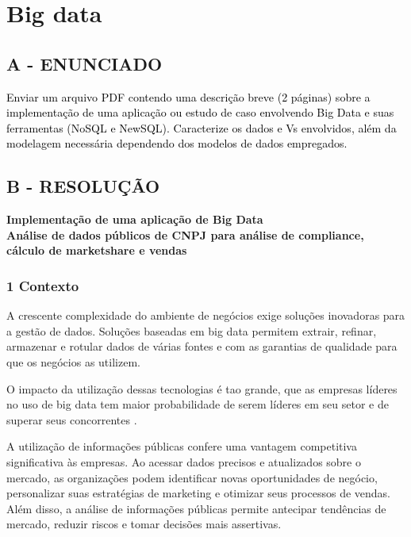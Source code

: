 \label{ap:ap10}
\chapter{Big data}
\section*{\textbf{A - ENUNCIADO}}

\textcolor{black}{Enviar um arquivo PDF contendo uma descrição breve (2 páginas) sobre a implementação de uma aplicação
ou estudo de caso envolvendo Big Data e suas ferramentas (NoSQL e NewSQL). Caracterize os dados e Vs envolvidos, além
da modelagem necessária dependendo dos modelos de dados empregados.}

\section*{\textbf{B - RESOLUÇÃO}}

\begin{center}
\textbf{\large Implementação de uma aplicação de Big Data} \\[0.5em]
\textbf{Análise de dados públicos de CNPJ para análise de compliance, cálculo de marketshare e vendas}
\end{center}

\subsection*{\textbf{1 Contexto}}

A crescente complexidade do ambiente de negócios exige soluções inovadoras para a gestão de dados. Soluções baseadas em big data permitem extrair, refinar, armazenar e rotular dados de várias fontes e com as garantias de qualidade para que os negócios as utilizem.

O impacto da utilização dessas tecnologias é tao grande, que as empresas líderes no uso de big data tem maior probabilidade de serem líderes em seu setor e de superar seus concorrentes \cite{mcafee2012big}. 

A utilização de informações públicas confere uma vantagem competitiva significativa às empresas. Ao acessar dados precisos e atualizados sobre o mercado, as organizações podem identificar novas oportunidades de negócio, personalizar suas estratégias de marketing e otimizar seus processos de vendas. Além disso, a análise de informações públicas permite antecipar tendências de mercado, reduzir riscos e tomar decisões mais assertivas.

